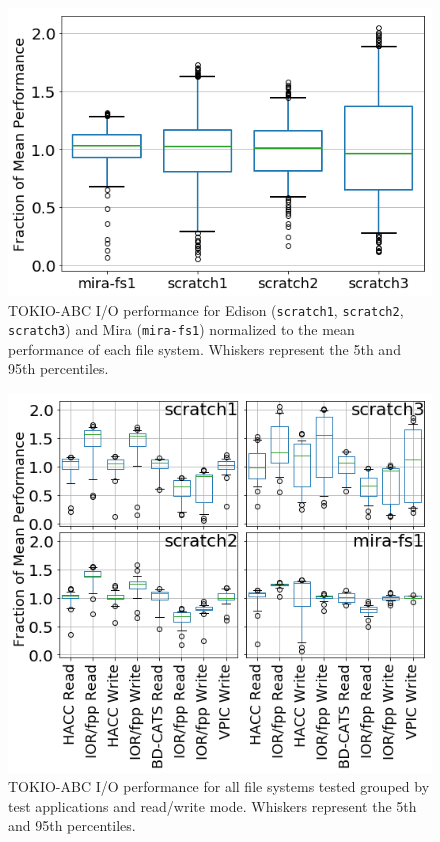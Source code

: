 \documentclass[conference,10pt,compsocconf]{IEEEtran}
\begin{document}
\begin{figure}[t]
\centering
\includegraphics[width=1.0\columnwidth]{figs/perf-boxplots-per-fs.png}
\caption{TOKIO-ABC I/O performance for Edison (\texttt{scratch1},
\texttt{scratch2}, \texttt{scratch3}) and Mira (\texttt{mira-fs1}) normalized to
the mean performance of each file system.  Whiskers represent the 5th and 95th
percentiles.}
\label{fig:perf-summary-boxplots-fs}
\end{figure}

\begin{figure}[t]
\centering
\includegraphics[width=1.0\columnwidth]{figs/perf-boxplots.png}
\caption{TOKIO-ABC I/O performance for all file systems tested grouped by test
applications and read/write mode.  Whiskers represent the 5th and 95th
percentiles.}
\label{fig:tokio-abc-perf-boxplots}
\end{figure}
\end{document}
